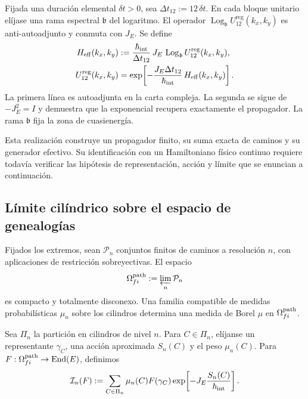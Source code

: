 Fijada una duración elemental \(\delta t>0\), sea
\(\Delta t_{12}:=12\,\delta t\). En cada bloque unitario elíjase una rama
espectral \(\mathfrak b\) del logaritmo. El operador
\(\operatorname{Log}_{\mathfrak b}U_{12}^{\mathrm{reg}}(k_x,k_y)\) es
anti-autoadjunto y conmuta con \(J_E\). Se define
\begin{equation}
 \begin{aligned}
 H_{\rm eff}(k_x,k_y)
 &:=
 \frac{\hbar_{\rm int}}{\Delta t_{12}}\,
 J_E\,
 \operatorname{Log}_{\mathfrak b}
 U_{12}^{\mathrm{reg}}(k_x,k_y),\\
 U_{12}^{\mathrm{reg}}(k_x,k_y)
 &=
 \exp\!\left[
  -\frac{J_E\Delta t_{12}}{\hbar_{\rm int}}\,
  H_{\rm eff}(k_x,k_y)
 \right].
 \end{aligned}
 \label{x_reciprocidad:eq:hamiltoniano-efectivo-registro-27-rev3}
\end{equation}
La primera línea es autoadjunta en la carta compleja. La segunda se sigue de
\(-J_E^2=I\) y demuestra que la exponencial recupera exactamente el
propagador. La rama \(\mathfrak b\) fija la zona de cuasienergía.

Esta realización construye un propagador finito, su suma exacta de caminos y
su generador efectivo. Su identificación con un Hamiltoniano físico continuo
requiere todavía verificar las hipótesis de representación, acción y límite
que se enuncian a continuación.

\subsection{Límite cilíndrico sobre el espacio de genealogías}

Fijados los extremos, sean \(\mathcal P_n\) conjuntos finitos de caminos a
resolución \(n\), con aplicaciones de restricción sobreyectivas. El espacio
\[
 \Omega^{\rm path}_{fi}:=\varprojlim_n\mathcal P_n
\]
es compacto y totalmente disconexo. Una familia compatible de medidas
probabilísticas \(\mu_n\) sobre los cilindros determina una medida de Borel
\(\mu\) en \(\Omega^{\rm path}_{fi}\).

Sea \(\Pi_n\) la partición en cilindros de nivel \(n\). Para
\(C\in\Pi_n\), elíjanse un representante \(\gamma_C\), una acción aproximada
\(S_n(C)\) y el peso \(\mu_n(C)\). Para
\(F:\Omega^{\rm path}_{fi}\to\operatorname{End}(E)\), definimos
\begin{equation}
 \mathcal I_n(F)
 :=\sum_{C\in\Pi_n}\mu_n(C)F(\gamma_C)
 \exp\!\left[-J_E\frac{S_n(C)}{\hbar_{\rm int}}\right].
 \label{x_reciprocidad:eq:integral-cilindrica-aproximante-rev2}
\end{equation}

